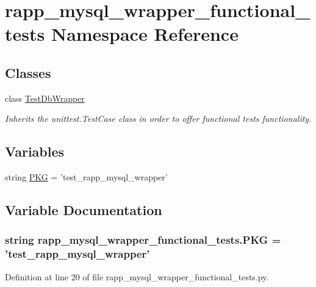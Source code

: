 \hypertarget{namespacerapp__mysql__wrapper__functional__tests}{\section{rapp\-\_\-mysql\-\_\-wrapper\-\_\-functional\-\_\-tests Namespace Reference}
\label{namespacerapp__mysql__wrapper__functional__tests}
}
\subsection*{Classes}
\begin{DoxyCompactItemize}
\item 
class \hyperlink{classrapp__mysql__wrapper__functional__tests_1_1TestDbWrapper}{Test\-Db\-Wrapper}
\begin{DoxyCompactList}\small\item\em Inherits the unittest.\-Test\-Case class in order to offer functional tests functionality. \end{DoxyCompactList}\end{DoxyCompactItemize}
\subsection*{Variables}
\begin{DoxyCompactItemize}
\item 
string \hyperlink{namespacerapp__mysql__wrapper__functional__tests_ab73ce8266896019c962554ec5a32bbef}{P\-K\-G} = 'test\-\_\-rapp\-\_\-mysql\-\_\-wrapper'
\end{DoxyCompactItemize}


\subsection{Variable Documentation}
\hypertarget{namespacerapp__mysql__wrapper__functional__tests_ab73ce8266896019c962554ec5a32bbef}{
\subsubsection[{P\-K\-G}]{\setlength{\rightskip}{0pt plus 5cm}string rapp\-\_\-mysql\-\_\-wrapper\-\_\-functional\-\_\-tests.\-P\-K\-G = 'test\-\_\-rapp\-\_\-mysql\-\_\-wrapper'}}\label{namespacerapp__mysql__wrapper__functional__tests_ab73ce8266896019c962554ec5a32bbef}


Definition at line 20 of file rapp\-\_\-mysql\-\_\-wrapper\-\_\-functional\-\_\-tests.\-py.

